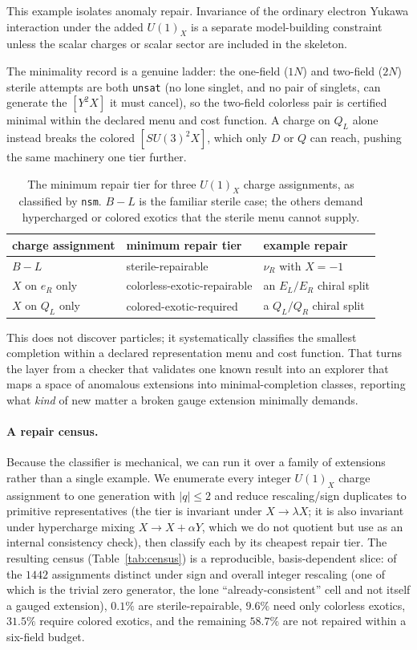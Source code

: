 \documentclass[11pt]{article}
\newcommand{\nsm}{\texttt{nsm}}
\newcommand{\UX}{U(1)_X}
\newcommand{\SUthree}{SU(3)}
\begin{document}
This example isolates anomaly repair. Invariance of the ordinary electron
Yukawa interaction under the added $\UX$ is a separate model-building constraint
unless the scalar charges or scalar sector are included in the skeleton.

The minimality record is a genuine ladder: the one-field ($1N$) and two-field
($2N$) sterile attempts are both \texttt{unsat} (no lone singlet, and no pair of
singlets, can generate the $[Y^2X]$ it must cancel), so the two-field colorless
pair is certified minimal within the declared menu and cost function.
A charge on $Q_L$ alone instead breaks the colored $[\SUthree^2X]$, which only
$D$ or $Q$ can reach, pushing the same machinery one tier further.

\begin{table}[t]
\centering
\small
\begin{tabular}{@{}lll@{}}
\toprule
charge assignment & minimum repair tier & example repair\\
\midrule
$B\!-\!L$ & sterile-repairable & $\nu_R$ with $X=-1$\\
$X$ on $e_R$ only & colorless-exotic-repairable & an $E_L/E_R$ chiral split\\
$X$ on $Q_L$ only & colored-exotic-required & a $Q_L/Q_R$ chiral split\\
\bottomrule
\end{tabular}
\caption{The minimum repair tier for three $\UX$ charge assignments, as
classified by \nsm{}. $B\!-\!L$ is the familiar sterile case; the others demand
hypercharged or colored exotics that the sterile menu cannot supply.}
\label{tab:tiers}
\end{table}

This does not discover particles; it systematically classifies the smallest
completion within a declared representation menu and cost function. That turns
the layer from a checker that validates one known result into an explorer that
maps a space of anomalous extensions into minimal-completion classes, reporting
what \emph{kind} of new matter a broken gauge extension minimally demands.

\paragraph{A repair census.}
Because the classifier is mechanical, we can run it over a family of extensions
rather than a single example. We enumerate every integer $\UX$ charge assignment
to one generation with $|q|\le 2$ and reduce rescaling/sign duplicates to
primitive representatives (the tier is invariant under $X\to\lambda X$; it is
also invariant under hypercharge mixing $X\to X+\alpha Y$, which we do not
quotient but use as an internal consistency check), then classify each by its
cheapest repair tier. The resulting census (Table~\ref{tab:census}) is a
reproducible, basis-dependent slice: of the $1442$ assignments distinct under
sign and overall integer rescaling (one of which is the trivial zero generator,
the lone ``already-consistent'' cell and not itself a gauged extension), $0.1\%$
are sterile-repairable, $9.6\%$ need only colorless exotics, $31.5\%$ require
colored exotics, and the remaining $58.7\%$ are not repaired within a six-field
budget.
\end{document}
